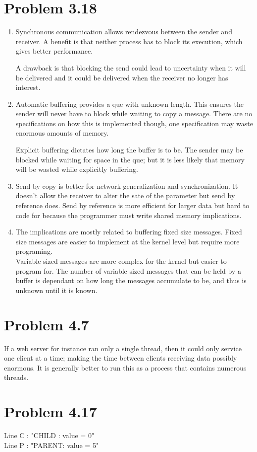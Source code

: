\documentclass[a4paper,11pt]{article}
\theoremstyle{mytheor}
\begin{document}
\section*{Problem 3.18}
\begin{enumerate}
\item Synchronous communication allows rendezvous between the sender and receiver. A benefit is that neither process has to block its execution, which gives better performance. \par A drawback is that blocking the send could lead to uncertainty when it will be delivered and it could be delivered when the receiver no longer has interest. 

\item Automatic buffering provides a que with unknown length. This ensures the sender will never have to block while waiting to copy a message.  There are no specifications on how this is implemented though, one specification may waste enormous amounts of memory.
\par 
    Explicit buffering dictates how long the buffer is to be. The sender may be blocked while waiting for space in the que; but it is less likely that memory will be wasted while explicitly buffering. 
    
\item Send by copy is better for network generalization and synchronization. It doesn't allow the receiver to alter the sate of the parameter but send by reference does.  Send by reference is more efficient for larger data but hard to code for because the programmer must write shared memory implications.

\item The implications are mostly related to buffering fixed size messages. Fixed size messages are easier to implement at the kernel level but require more programing. 
\\Variable sized messages are more complex for the kernel but easier to program for. The number of variable sized messages that can be held by a buffer is dependant on how long the messages accumulate to be, and thus is unknown until it is known. 
\end{enumerate}

\section*{Problem 4.7}
If a web server for instance ran only a single thread, then it could only service one client at a time; making the time between clients receiving data possibly enormous.  It is generally better to run this as a process that contains numerous threads. 

\section*{Problem 4.17}

Line C : "CHILD : value = 0" \\
Line P : "PARENT: value = 5" \\
\end{document}
